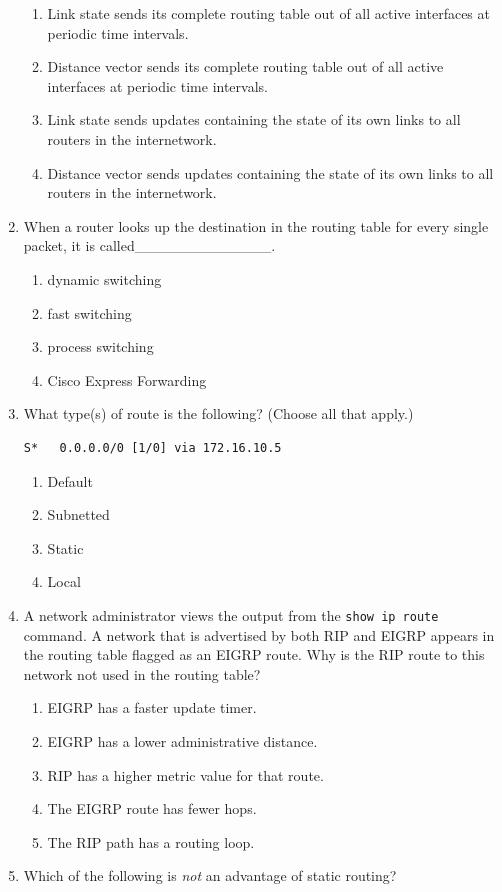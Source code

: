 \begin{enumerate}
  \begin{enumerate}
  \tightlist
  \item
    Link state sends its complete routing table out of all active
    interfaces at periodic time intervals.
  \item
    Distance vector sends its complete routing table out of all active
    interfaces at periodic time intervals.
  \item
    Link state sends updates containing the state of its own links to
    all routers in the internetwork.
  \item
    Distance vector sends updates containing the state of its own links
    to all routers in the internetwork.
  \end{enumerate}
\item
  When a router looks up the destination in the routing table for every
  single packet, it is called\_\_\_\_\_\_\_\_\_\_\_\_\_.

  \begin{enumerate}
  \tightlist
  \item
    dynamic switching
  \item
    fast switching
  \item
    process switching
  \item
    Cisco Express Forwarding
  \end{enumerate}
\item
  What type(s) of route is the following? (Choose all that apply.)

\begin{verbatim}
S*   0.0.0.0/0 [1/0] via 172.16.10.5
\end{verbatim}

  \begin{enumerate}
  \tightlist
  \item
    Default
  \item
    Subnetted
  \item
    Static
  \item
    Local
  \end{enumerate}
\item
  A network administrator views the output from the
  \texttt{show\ ip\ route} command. A network that is advertised by both
  RIP and EIGRP appears in the routing table flagged as an EIGRP route.
  Why is the RIP route to this network not used in the routing table?

  \begin{enumerate}
  \tightlist
  \item
    EIGRP has a faster update timer.
  \item
    EIGRP has a lower administrative distance.
  \item
    RIP has a higher metric value for that route.
  \item
    The EIGRP route has fewer hops.
  \item
    The RIP path has a routing loop.
  \end{enumerate}
\item
  \protect\hypertarget{c09.xhtmlux5cux23Page_408}{}{}Which of the
  following is \emph{not} an advantage of static routing?


\end{enumerate}
